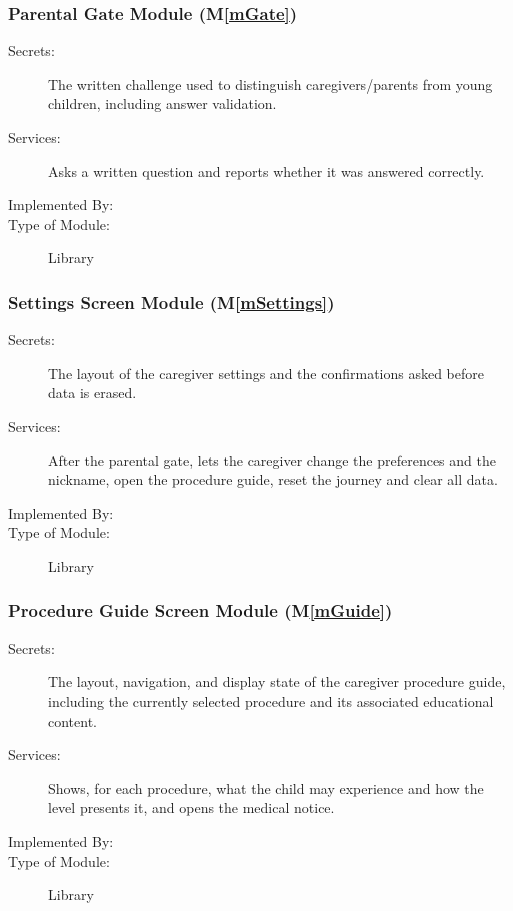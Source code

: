 \documentclass[10pt, titlepage]{article}
\newcommand{\mplainref}[1]{M\ref*{#1}}
\begin{document}
\subsubsection{Parental Gate Module (\mplainref{mGate})}\label{md:mGate}

\begin{description}
\item[Secrets:] The written challenge used to distinguish caregivers/parents
  from young children, including answer validation.
\item[Services:] Asks a written question and reports whether it was answered
  correctly.
\item[Implemented By:] \progname{}
\item[Type of Module:] Library
\end{description}

\subsubsection{Settings Screen Module (\mplainref{mSettings})}\label{md:mSettings}

\begin{description}
\item[Secrets:] The layout of the caregiver settings and the confirmations asked
  before data is erased.
\item[Services:] After the parental gate, lets the caregiver change the
  preferences and the nickname, open the procedure guide, reset the journey and
  clear all data.
\item[Implemented By:] \progname{}
\item[Type of Module:] Library
\end{description}

\subsubsection{Procedure Guide Screen Module (\mplainref{mGuide})}\label{md:mGuide}

\begin{description}
\item[Secrets:] The layout, navigation, and display state of the
  caregiver procedure guide, including the currently selected
  procedure and its associated educational content.
\item[Services:] Shows, for each procedure, what the child may experience and
  how the level presents it, and opens the medical notice.
\item[Implemented By:] \progname{}
\item[Type of Module:] Library
\end{description}
\end{document}
